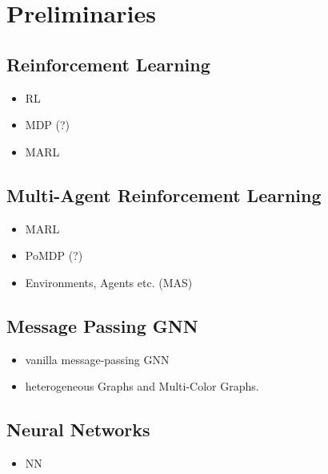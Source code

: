 
\chapter{Preliminaries}
\label{ch:Preliminaries}
\section{Reinforcement Learning}
\begin{itemize}[noitemsep,nolistsep]
	\item RL
	\item MDP (?)
	\item MARL
\end{itemize}

\section{Multi-Agent Reinforcement Learning}
\begin{itemize}[noitemsep,nolistsep]
	\item MARL
	\item PoMDP (?)
	\item Environments, Agents etc. (MAS)
\end{itemize}

\section{Message Passing GNN}
\begin{itemize}[noitemsep,nolistsep]
	\item vanilla message-passing GNN
	\item heterogeneous Graphs and Multi-Color Graphs.
\end{itemize}

\section{Neural Networks}
\begin{itemize}[noitemsep,nolistsep]
	\item NN
\end{itemize}